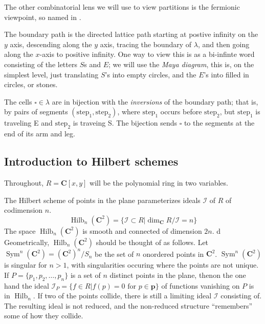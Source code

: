 \documentclass{amsart}[12pt]
\theoremstyle{definition}
\newcommand{\C}{\mathbf{C}}
\DeclareMathOperator{\Hilb}{Hilb}
\DeclareMathOperator{\Sym}{Sym}
\begin{document}
The other combinatorial lens we will use to view partitions is the fermionic viewpoint, so named in .  

The boundary path is the directed lattice path starting at postive infinity on the $y$ axis, descending along the $y$ axis, tracing the boundary of $\lambda$, and then going along the $x$-axis to positive infinity.  One way to view this is as a bi-infinte word consisting of the letters $S$s and $E$; we will use the \emph{Maya diagram}, this is, on the simplest level, just translating $S$'s into empty circles, and the $E$'s into filled in circles, or stones.  



The cells $\square\in\lambda$ are in bijection with the
\emph{inversions} of the boundary path; that is, by pairs of segments
$(\text{step}_1, \text{step}_2)$, where $\text{step}_1$ occurs before $\text{step}_2$, but $\text{step}_1$ is traveling E and $\text{step}_2$ is traveing S.  The bijection sends $\square$ to the segments at the end of its arm and leg.





\subsection{Introduction to Hilbert schemes}

Throughout, $R=\C[x,y]$ will be the polynomial ring in two variables.  

The Hilbert scheme of points in the plane parameterizes ideals $\mathcal{I}$ of $R$ of codimension $n$.
$$\Hilb_n(\C^2)=\{\mathcal{I}\subset R | \dim_\C R/\mathcal{I}=n\}$$
The space $\Hilb_n(\C^2)$ is smooth and connected of dimension $2n$.
d
Geometrically, $\Hilb_n(\C^2)$ should be thought of as follows.  Let $\Sym^n(\C^2)=(\C^2)^n/S_n$ be the set of $n$ onordered points in $\C^2$.  $\Sym^n(\C^2)$ is singular for $n>1$, with singularities occuring where the points are not unique.  
If $P=\{p_1,p_2,\dots, p_n\}$ is a set of $n$ distinct points in the plane, thenon the one hand the ideal $\mathcal{I}_{P}=\{f\in R| f(p)=0 \text{ for }p\in \mathbf{p}\}$ of functions vanishing on $P$ is in $\Hilb_n$.  If two of the points collide, there is still a limiting ideal $\mathcal{I}$ consisting of.  The resulting ideal is not reduced, and the non-reduced structure ``remembers'' some of how they collide.
\end{document}
